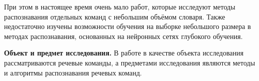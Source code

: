 
При этом в настоящее время очень мало работ, которые исследуют методы распознавания отдельных команд с небольшим объёмом словаря.
Также недостаточно изучены возможности обучения на выборке небольшого размера в методах распознавания, основанных на нейронных сетях глубокого обучения.

\textbf{Объект и предмет исследования.}
В работе в качестве объекта исследования рассматриваются речевые команды, а предметами исследования являются методы и алгоритмы распознавания речевых команд.


